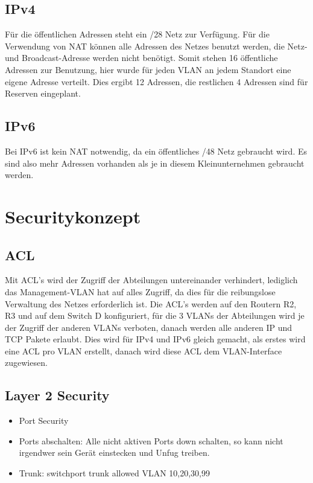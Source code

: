 \documentclass[11pt,a4paper]{scrreprt}
\begin{document}
\subsection{IPv4}
Für die öffentlichen Adressen steht ein /28 Netz zur Verfügung. Für die Verwendung von \acs{NAT} können alle Adressen des Netzes benutzt werden, die Netz- und Broadcast-Adresse werden nicht benötigt. Somit stehen 16 öffentliche Adressen zur Benutzung, hier wurde für jeden \acs{VLAN} an jedem Standort eine eigene Adresse verteilt. Dies ergibt 12 Adressen, die restlichen 4 Adressen sind für Reserven eingeplant.

\subsection{IPv6}
Bei IPv6 ist kein \acs{NAT} notwendig, da ein öffentliches /48 Netz gebraucht wird. Es sind also mehr Adressen vorhanden als je in diesem Kleinunternehmen gebraucht werden.

\newpage
\section{Securitykonzept} 
\subsection{ACL} \label{acl}
Mit \acs{ACL}'s wird der Zugriff der Abteilungen untereinander verhindert, lediglich das Management-\acs{VLAN} hat auf alles Zugriff, da dies für die reibungslose Verwaltung des Netzes erforderlich ist.
Die \acs{ACL}'s werden auf den Routern R2, R3 und auf dem Switch D konfiguriert, für die 3 \acs{VLAN}s der Abteilungen wird je der Zugriff der anderen \acs{VLAN}s verboten, danach werden alle anderen IP und TCP Pakete erlaubt. Dies wird für IPv4 und IPv6 gleich gemacht, als erstes wird eine ACL pro \acs{VLAN} erstellt, danach wird diese \acs{ACL} dem \acs{VLAN}-Interface zugewiesen.

\subsection{Layer 2 Security}
\begin{itemize}
\item Port Security
\item Ports abschalten: Alle nicht aktiven Ports down schalten, so kann nicht irgendwer sein Gerät einstecken und Unfug treiben.
\item Trunk: switchport trunk allowed \acs{VLAN} 10,20,30,99
\end{itemize}
\end{document}
